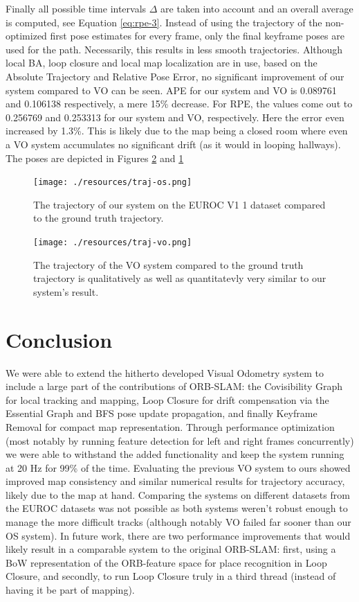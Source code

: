 \documentclass[a4paper, 10pt]{article}
\begin{document}
Finally all possible time intervals \(\Delta\) are taken into account and an overall average is computed, see Equation \ref{eq:rpe-3}.
Instead of using the trajectory of the non-optimized first pose estimates for every frame, only the final keyframe poses are used for the path.
Necessarily, this results in less smooth trajectories. Although local BA, loop closure and local map localization are in use, based on the Absolute Trajectory and Relative Pose Error, no significant improvement of 
our system compared to VO can be seen.
APE for our system and VO is 0.089761 and 0.106138 respectively, a mere 15\% decrease. For RPE, the values come out to 0.256769 and 0.253313 for our system and VO, respectively.
Here the error even increased by 1.3\%.
This is likely due to the map being a closed room where even a VO system accumulates no significant drift (as it would in looping hallways). The poses are depicted in Figures \ref{fig:org6c39244} and \ref{fig:orgeea4f6c}

\begin{figure}[htbp]
\centering
\texttt{[image: ./resources/traj-os.png]}
\caption{\label{fig:orgeea4f6c}
The trajectory of our system on the EUROC V1 1 dataset compared to the ground truth trajectory.}
\end{figure}

\begin{figure}[htbp]
\centering
\texttt{[image: ./resources/traj-vo.png]}
\caption{\label{fig:org6c39244}
The trajectory of the VO system compared to the ground truth trajectory is qualitatively as well as quantitatevly very similar to our system's result.}
\end{figure}

\section{Conclusion}
\label{sec:orga5a5122}
We were able to extend the hitherto developed Visual Odometry system to include a large part of the contributions of ORB-SLAM: the Covisibility Graph for local tracking
and mapping, Loop Closure for drift compensation via the Essential Graph and BFS pose update propagation, and finally Keyframe Removal for compact map representation. Through performance optimization (most notably
by running feature detection for left and right frames concurrently) we were able to withstand the added functionality and keep the system running at 20 Hz for 99\% of the time. 
Evaluating the previous VO system to ours showed improved map consistency and similar numerical results for trajectory accuracy, 
likely due to the map at hand. Comparing the systems on different datasets from the EUROC datasets was not possible as both systems weren't robust enough
to manage the more difficult tracks (although notably VO failed far sooner than our OS system). In future work, there are two performance improvements that would likely result in a comparable
system to the original ORB-SLAM: first, using a BoW representation of the ORB-feature space for place recognition in Loop Closure, and secondly, to run Loop Closure truly in a third thread (instead of having it be part
of mapping).




\end{document}
